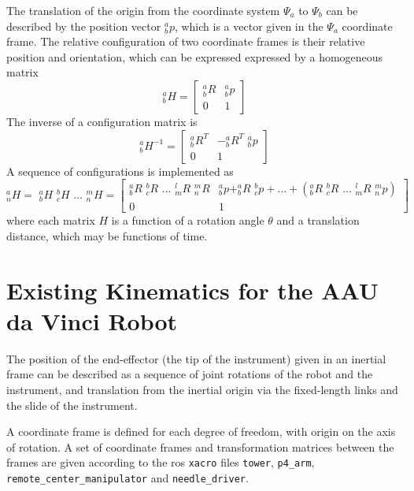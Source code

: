The translation of the origin from the coordinate system $\Psi_a$ to $\Psi_b$ can be described by the position vector $^a_bp$, which is a vector given in the $\Psi_a$ coordinate frame.
The relative configuration of two coordinate frames is their relative position and orientation, which can be expressed expressed by a homogeneous matrix
\begin{equation}
^a_bH = 
\begin{bmatrix}
^a_bR & ^a_bp\\
0 & 1
\end{bmatrix}
\end{equation}
The inverse of a configuration matrix is
\begin{equation}
^a_bH^{-1} = 
\begin{bmatrix}
^a_bR^T & -^a_bR^T\,\,^a_bp\\
0 & 1
\end{bmatrix}
\end{equation}
A sequence of configurations is implemented as
\begin{equation}
^a_nH =\,\, ^a_bH \,\, ^b_cH \,\,...\,\, ^m_nH = 
\begin{bmatrix}
^a_bR \,\, ^b_cR \,\,...\,\, ^l_mR \,\,^m_nR & ^a_bp + ^a_bR \,\, ^b_cp + ... + (^a_bR\,\, ^b_cR \,\,...\,\, ^l_mR \,\, ^m_np )\\
0 & 1
\end{bmatrix}
\end{equation}
where each matrix $H$ is a function of a rotation angle $\theta$ and a translation distance, which may be functions of time.


\section{Existing Kinematics for the AAU da Vinci Robot}
The position of the end-effector (the tip of the instrument) given in an inertial frame can be described as a sequence of joint rotations of the robot and the instrument, and translation from the inertial origin via the fixed-length links and the slide of the instrument.

A coordinate frame is defined for each degree of freedom, with origin on the axis of rotation. A set of coordinate frames and transformation matrices between the frames are given according to the \gls{ros} \texttt{xacro} files \texttt{tower}, \texttt{p4\_arm}, \texttt{remote\_center\_manipulator} and \texttt{needle\_driver}.

